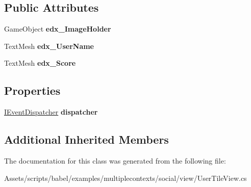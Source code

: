 \subsection*{Public Attributes}
\begin{DoxyCompactItemize}
\item 
\hypertarget{classbabel_1_1examples_1_1multiplecontexts_1_1social_1_1_user_tile_view_aecb8f959d7c78839ed7432ed5eba1fa3}{Game\-Object {\bfseries edx\-\_\-\-Image\-Holder}}\label{classbabel_1_1examples_1_1multiplecontexts_1_1social_1_1_user_tile_view_aecb8f959d7c78839ed7432ed5eba1fa3}

\item 
\hypertarget{classbabel_1_1examples_1_1multiplecontexts_1_1social_1_1_user_tile_view_ad0962202220b69b89e0e17670bbe31e8}{Text\-Mesh {\bfseries edx\-\_\-\-User\-Name}}\label{classbabel_1_1examples_1_1multiplecontexts_1_1social_1_1_user_tile_view_ad0962202220b69b89e0e17670bbe31e8}

\item 
\hypertarget{classbabel_1_1examples_1_1multiplecontexts_1_1social_1_1_user_tile_view_a48b90ec1b1ef9b19ef228f5e1ab09f04}{Text\-Mesh {\bfseries edx\-\_\-\-Score}}\label{classbabel_1_1examples_1_1multiplecontexts_1_1social_1_1_user_tile_view_a48b90ec1b1ef9b19ef228f5e1ab09f04}

\end{DoxyCompactItemize}
\subsection*{Properties}
\begin{DoxyCompactItemize}
\item 
\hypertarget{classbabel_1_1examples_1_1multiplecontexts_1_1social_1_1_user_tile_view_a1552112272869adc538962ef9c61f653}{\hyperlink{interfacebabel_1_1extensions_1_1dispatcher_1_1eventdispatcher_1_1api_1_1_i_event_dispatcher}{I\-Event\-Dispatcher} {\bfseries dispatcher}}\label{classbabel_1_1examples_1_1multiplecontexts_1_1social_1_1_user_tile_view_a1552112272869adc538962ef9c61f653}

\end{DoxyCompactItemize}
\subsection*{Additional Inherited Members}


The documentation for this class was generated from the following file\-:\begin{DoxyCompactItemize}
\item 
Assets/scripts/babel/examples/multiplecontexts/social/view/User\-Tile\-View.\-cs\end{DoxyCompactItemize}
